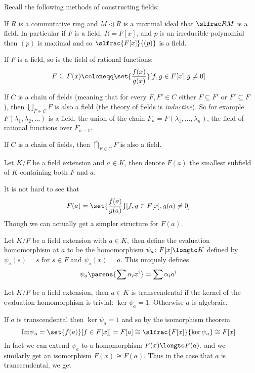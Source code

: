 Recall the following methods of constructing fields:
\benum
    \item If $R$ is a commutative ring and $M\triangleleft R$ is a maximal ideal that $\slfrac RM$ is a field.
    In particular if $F$ is a field, $R=F[x]$, and $p$ is an irreducible polynomial then $(p)$ is maximal and so $\slfrac{F[x]}{(p)}$ is a field.
    \item If $F$ is a field, so is the field of rational functions:
    $$ F \subseteq F(x) \coloneqq \set{\frac{f(x)}{g(x)}}[{f,g\in F[x],g\neq0}] $$
    \item If $C$ is a chain of fields (meaning that for every $F,F'\in C$ either $F\subseteq F'$ or $F'\subseteq F$), then $\bigcup_{F\in C}F$ is also a field (the theory of fields is {\it inductive}).
    So for example $F(\lambda_1,\lambda_2,\dots)$ is a field, the union of the chain $F_n=F(\lambda_1,\dots,\lambda_n)$, the field of rational functions over $F_{n-1}$.
    \item If $C$ is a chain of fields, then $\bigcap_{F\in C}F$ is also a field.
\eenum

\bdefn

    Let $K/F$ be a field extension and $a\in K$, then denote $F(a)$ the smallest subfield of $K$ containing both $F$ and $a$.

\edefn

It is not hard to see that
$$ F(a) = \set{\frac{f(a)}{g(a)}}[{f,g\in F[x],g(a)\neq0}] $$
Though we can actually get a simpler structure for $F(a)$.

\bdefn

    Let $K/F$ be a field extension with $a\in K$, then define the {\emphcolor evaluation homomorphism} at $a$ to be the homomorphism $\psi_a\colon F[x]\longto K$ defined by $\psi_a(s)=s$ for $s\in F$ and
    $\psi_a(x)=a$.
    This uniquely defines
    $$ \psi_a\parens{\sum\alpha_ix^i} = \sum\alpha_ia^i $$

\edefn

\bdefn

    Let $K/F$ be a field extension, then $a\in K$ is {\emphcolor transcendental} if the kernel of the evaluation homomorphism is trivial: $\ker\psi_a=1$.
    Otherwise $a$ is {\emphcolor algebraic}.

\edefn

If $a$ is transcendental then $\ker\psi_a=1$ and so by the isomorphism theorem
$$ {\rm Im}\psi_a = \set{f(a)}[{f\in F[x]}] = F[a] \cong \slfrac{F[x]}{\ker\psi_a} \cong F[x] $$
In fact we can extend $\psi_a$ to a homomorphism $F(x)\longto F(a)$, and we similarly get an isomorphism $F(x)\cong F(a)$.
Thus in the case that $a$ is transcendental, we get

